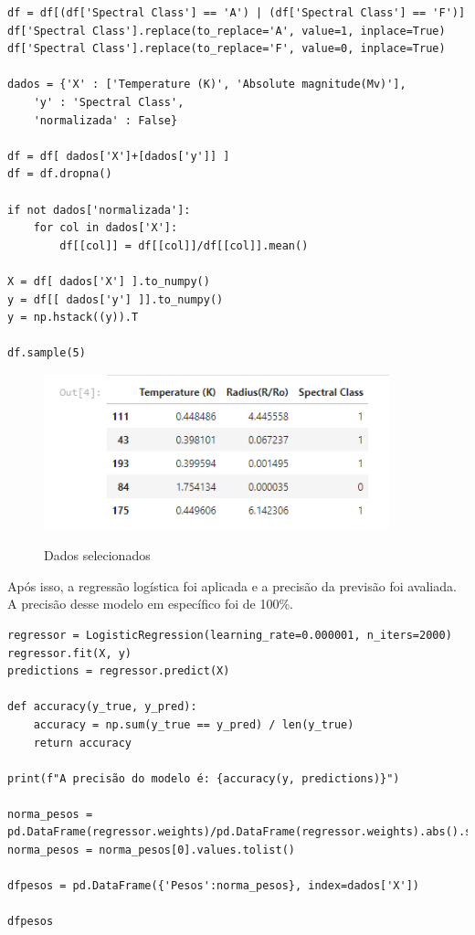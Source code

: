 \documentclass[12pt]{article}
\begin{document}
\begin{lstlisting}
df = df[(df['Spectral Class'] == 'A') | (df['Spectral Class'] == 'F')]
df['Spectral Class'].replace(to_replace='A', value=1, inplace=True)
df['Spectral Class'].replace(to_replace='F', value=0, inplace=True)

dados = {'X' : ['Temperature (K)', 'Absolute magnitude(Mv)'],
    'y' : 'Spectral Class',
    'normalizada' : False}

df = df[ dados['X']+[dados['y']] ]
df = df.dropna()

if not dados['normalizada']:
    for col in dados['X']:
        df[[col]] = df[[col]]/df[[col]].mean()

X = df[ dados['X'] ].to_numpy()
y = df[[ dados['y'] ]].to_numpy()
y = np.hstack((y)).T

df.sample(5)
\end{lstlisting}

\begin{figure}[h]
\caption{Dados selecionados}
\centering
\includegraphics[width=10cm]{out1.png}
\label{figura:out1}
\end{figure}

Após isso, a regressão logística foi aplicada e a precisão da previsão foi avaliada. A precisão desse modelo em específico foi de 100\%.
\\
\begin{lstlisting}
regressor = LogisticRegression(learning_rate=0.000001, n_iters=2000)
regressor.fit(X, y)
predictions = regressor.predict(X)

def accuracy(y_true, y_pred):
    accuracy = np.sum(y_true == y_pred) / len(y_true)
    return accuracy

print(f"A precisão do modelo é: {accuracy(y, predictions)}")

norma_pesos = pd.DataFrame(regressor.weights)/pd.DataFrame(regressor.weights).abs().sum()
norma_pesos = norma_pesos[0].values.tolist()

dfpesos = pd.DataFrame({'Pesos':norma_pesos}, index=dados['X'])

dfpesos
\end{lstlisting}
\end{document}
